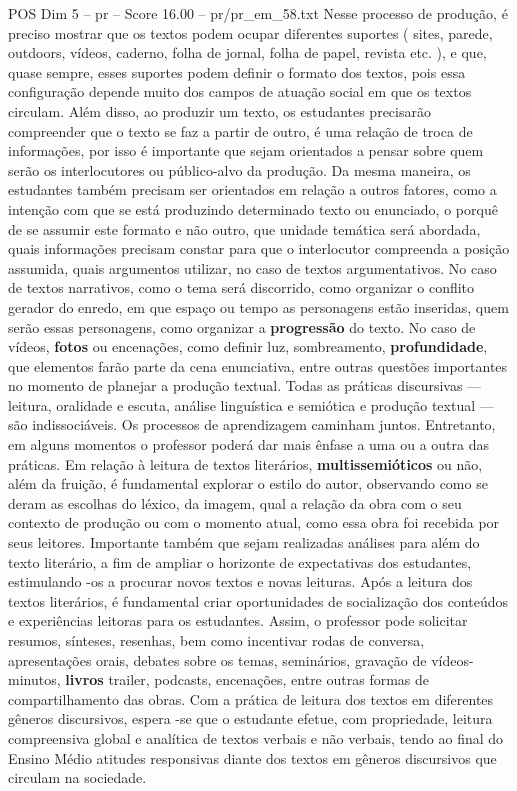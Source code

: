 \begin{textsample}{POS Dim 5 – pr – Score 16.00 – pr/pr\_em\_58.txt}
Nesse processo de produção, é preciso mostrar que os textos podem ocupar diferentes suportes ( sites, parede, outdoors, vídeos, caderno, folha de jornal, folha de papel, revista etc. ), e que, quase sempre, esses suportes podem definir o formato dos textos, pois essa configuração depende muito dos campos de atuação social em que os textos circulam.
Além disso, ao produzir um texto, os estudantes precisarão compreender que o texto se faz a partir de outro, é uma relação de troca de informações, por isso é importante que sejam orientados a pensar sobre quem serão os interlocutores ou público-alvo da produção.
Da mesma maneira, os estudantes também precisam ser orientados em relação a outros fatores, como a intenção com que se está produzindo determinado texto ou enunciado, o porquê de se assumir este formato e não outro, que unidade temática será abordada, quais informações precisam constar para que o interlocutor compreenda a posição assumida, quais argumentos utilizar, no caso de textos argumentativos.
No caso de textos narrativos, como o tema será discorrido, como organizar o conflito gerador do enredo, em que espaço ou tempo as personagens estão inseridas, quem serão essas personagens, como organizar a \textbf{progressão} do texto.
No caso de vídeos, \textbf{fotos} ou encenações, como definir luz, sombreamento, \textbf{profundidade}, que elementos farão parte da cena enunciativa, entre outras questões importantes no momento de planejar a produção textual.
Todas as práticas discursivas — leitura, oralidade e escuta, análise linguística e semiótica e produção textual — são indissociáveis.
Os processos de aprendizagem caminham juntos.
Entretanto, em alguns momentos o professor poderá dar mais ênfase a uma ou a outra das práticas.
Em relação à leitura de textos literários, \textbf{multissemióticos} ou não, além da fruição, é fundamental explorar o estilo do autor, observando como se deram as escolhas do léxico, da imagem, qual a relação da obra com o seu contexto de produção ou com o momento atual, como essa obra foi recebida por seus leitores.
Importante também que sejam realizadas análises para além do texto literário, a fim de ampliar o horizonte de expectativas dos estudantes, estimulando -os a procurar novos textos e novas leituras.
Após a leitura dos textos literários, é fundamental criar oportunidades de socialização dos conteúdos e experiências leitoras para os estudantes.
Assim, o professor pode solicitar resumos, sínteses, resenhas, bem como incentivar rodas de conversa, apresentações orais, debates sobre os temas, seminários, gravação de vídeos-minutos, \textbf{livros} trailer, podcasts, encenações, entre outras formas de compartilhamento das obras.
Com a prática de leitura dos textos em diferentes gêneros discursivos, espera -se que o estudante efetue, com propriedade, leitura compreensiva global e analítica de textos verbais e não verbais, tendo ao final do Ensino Médio atitudes responsivas diante dos textos em gêneros discursivos que circulam na sociedade.

\end{textsample}
